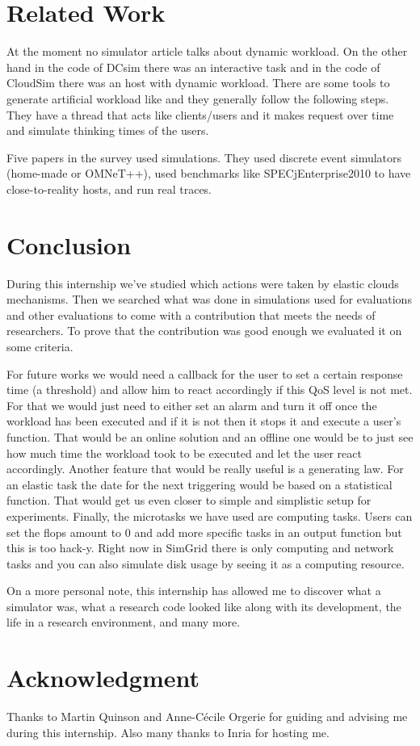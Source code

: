 \documentclass[a4paper, onecolumn, 11pt]{article}
\begin{document}
\section{Related Work} \label{sota}
At the moment no simulator article talks about dynamic workload. On the other
hand in the code of DCsim \cite{tighe2013towards} there was an interactive
task and in the code of CloudSim \cite{calheiros2011cloudsim} there was an
host with dynamic workload. There are some tools to generate artificial
workload like \cite{bodik2010characterizing} and they generally follow the
following steps. They have a thread that acts like clients/users and it makes
request over time and simulate thinking times of the users.

Five papers in the survey used simulations. They used discrete event 
simulators (home-made or OMNeT++), used benchmarks like SPECjEnterprise2010 
to have close-to-reality hosts, and run real traces.


\section{Conclusion} \label{conclu}
During this internship we've studied which actions were taken by elastic clouds 
mechanisms. Then we searched what was done in simulations used for evaluations 
and other evaluations to come with a contribution that meets the needs of 
researchers. To prove that the contribution was good enough we evaluated it on 
some criteria.

For future works we would need a callback for the user to set a certain 
response time (a threshold) and allow him to react accordingly if this QoS level
is not met. For that we would just need to either set an alarm and turn it off
once the workload has been executed and if it is not then it stops it and
execute a user's function. That would be an online solution and an offline one
would be to just see how much time the workload took to be executed and let the
user react accordingly. Another feature that would be really useful is a
generating law. For an elastic task the date for the next triggering would be
based on a statistical function. That would get us even closer to simple and
simplistic setup for experiments. Finally, the microtasks we have used are
computing tasks. Users can set the flops amount to 0 and add more specific tasks
in an output function but this is too hack-y. Right now in SimGrid there is only
computing and network tasks and you can also simulate disk usage by seeing it as
a computing resource.

On a more personal note, this internship has allowed me to discover what a 
simulator was, what a research code looked like along with its development, the 
life in a research environment, and many more.


\section*{Acknowledgment}
Thanks to Martin Quinson and Anne-C\'ecile Orgerie for guiding and advising me 
during this internship. Also many thanks to Inria for hosting me.




\end{document}

